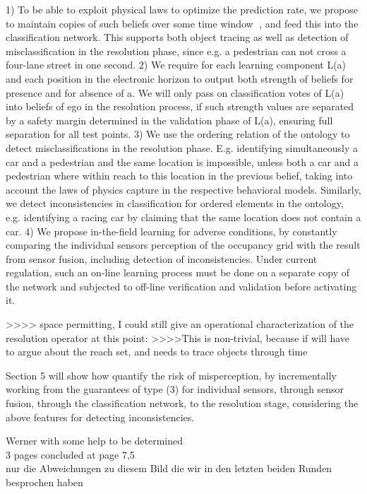 1) To be able to exploit physical laws to optimize the prediction rate, we propose to maintain copies of such beliefs over some time window , and feed this into the classification network. This supports both object tracing as well as detection of misclassification in the resolution phase, since e.g. a pedestrian can not cross a four-lane street in one second.
2) We require for each learning component L(a) and each position in the electronic horizon to output both strength of beliefs for presence and for absence of a. We will only pass on classification votes of L(a) into beliefs of ego in the resolution process, if such strength values are separated by a safety margin determined in the validation phase of L(a), ensuring full separation for all test points.
3) We use the ordering relation of the ontology to detect misclassifications in the resolution phase. E.g. identifying simultaneously a car and a pedestrian and the same location is impossible, unless both a car and a pedestrian where within reach to this location in the previous belief, taking into account the laws of physics capture in the respective behavioral models. Similarly, we detect inconsistencies in classification for ordered elements in the ontology, e.g. identifying a racing car by claiming that the same location does not contain a car.
4) We propose in-the-field learning for adverse conditions, by constantly comparing the individual sensors perception of the occupancy grid with the result from sensor fusion, including detection of inconsistencies. Under current regulation, such an on-line learning process must be done on a separate copy of the network and subjected to off-line verification and validation before activating it.

>>>> space permitting, I could still give an operational characterization of the resolution operator at this point: >>>>This is non-trivial, because if will have to argue about the reach set, and needs to trace objects through time

Section 5 will show how quantify the risk of misperception, by incrementally working from the guarantees of type (3) for individual sensors, through sensor fusion, through the classification network, to the resolution stage, considering the above features for detecting inconsistencies.


Werner with some help to be determined\\
3 pages	concluded at page 7,5\\
nur die Abweichungen zu diesem Bild die wir in den letzten beiden Runden besprochen haben
